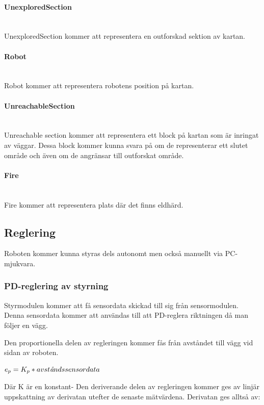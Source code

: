 \documentclass[a4paper,12pt,fleqn]{article}
\begin{document}
\paragraph{UnexploredSection} 
~\\
UnexploredSection kommer att representera en outforskad sektion av kartan. 

\paragraph{Robot} 
~\\
Robot kommer att representera robotens position på kartan. 

\paragraph{UnreachableSection} 
~\\
Unreachable section kommer att representera ett block på kartan som är inringat av väggar. Dessa block kommer kunna svara på om de representerar ett slutet område och även om de angränsar till outforskat område. 

\paragraph{Fire} 
~\\
Fire kommer att representera plats där det finns eldhärd. 

\newpage

\subsection{Reglering}

Roboten kommer kunna styras dels autonomt men också manuellt via PC-mjukvara. 

\subsubsection{PD-reglering av styrning}
Styrmodulen kommer att få sensordata skickad till sig från sensormodulen. Denna sensordata kommer att användas till att PD-reglera riktningen då man följer en vägg. 

Den proportionella delen av regleringen kommer fås från avståndet till vägg vid sidan av roboten. 

$ e_p = K_{p}*avst\text{\it{å}}ndssensordata $

Där K är en konstant- Den deriverande delen av regleringen kommer ges av linjär uppskattning av derivatan utefter de senaste mätvärdena. Derivatan ges alltså av: 
\end{document}
